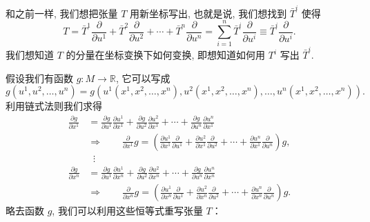 和之前一样, 我们想把张量 $T$ 用新坐标写出, 也就是说, 我们想找到 $\bar{T}^i$ 使得
\[
T=\bar{T}^1\frac{\partial}{\partial u^1}+\bar{T}^2\frac{\partial}{\partial u^2}+\cdots+\bar{T}^n\frac{\partial}{\partial u^n}
=\sum_{i=1}^{n}\bar{T}^i\frac{\partial}{\partial u^i}\equiv\bar{T}^i\frac{\partial}{\partial u^i}.
\]
我们想知道 $T$ 的分量在坐标变换下如何变换, 即想知道如何用 $T^i$ 写出 $\bar{T}^i$.

假设我们有函数 $g:M\to\mathbb{R}$, 它可以写成
\[
g\left(u^1,u^2,\ldots,u^n\right)=g\left(u^1\left(x^1,x^2,\ldots,x^n\right),u^2\left(x^1,x^2,\ldots,x^n\right),\ldots,u^n\left(x^1,x^2,\ldots,x^n\right)\right).
\]
利用链式法则我们求得
\begin{align*}
\frac{\partial g}{\partial x^1}&=\frac{\partial g}{\partial u^1}\frac{\partial u^1}{\partial x^1}+\frac{\partial g}{\partial u^2}\frac{\partial u^2}{\partial x^1}+\cdots+\frac{\partial g}{\partial u^n}\frac{\partial u^n}{\partial x^1}\\
&\Rightarrow\qquad\frac{\partial}{\partial x^1}g=\left(\frac{\partial u^1}{\partial x^1}\frac{\partial}{\partial u^1}+\frac{\partial u^2}{\partial x^1}\frac{\partial}{\partial u^2}+\cdots+\frac{\partial u^n}{\partial x^1}\frac{\partial}{\partial u^n}\right)g,\\
&\;\;\vdots\\
\frac{\partial g}{\partial x^n}&=\frac{\partial g}{\partial u^1}\frac{\partial u^1}{\partial x^n}+\frac{\partial g}{\partial u^2}\frac{\partial u^2}{\partial x^n}+\cdots+\frac{\partial g}{\partial u^n}\frac{\partial u^n}{\partial x^n}\\
&\Rightarrow\qquad\frac{\partial}{\partial x^n}g=\left(\frac{\partial u^1}{\partial x^n}\frac{\partial}{\partial u^1}+\frac{\partial u^2}{\partial x^n}\frac{\partial}{\partial u^2}+\cdots+\frac{\partial u^n}{\partial x^n}\frac{\partial}{\partial u^n}\right)g.
\end{align*}
略去函数 $g$, 我们可以利用这些恒等式重写张量 $T$：
